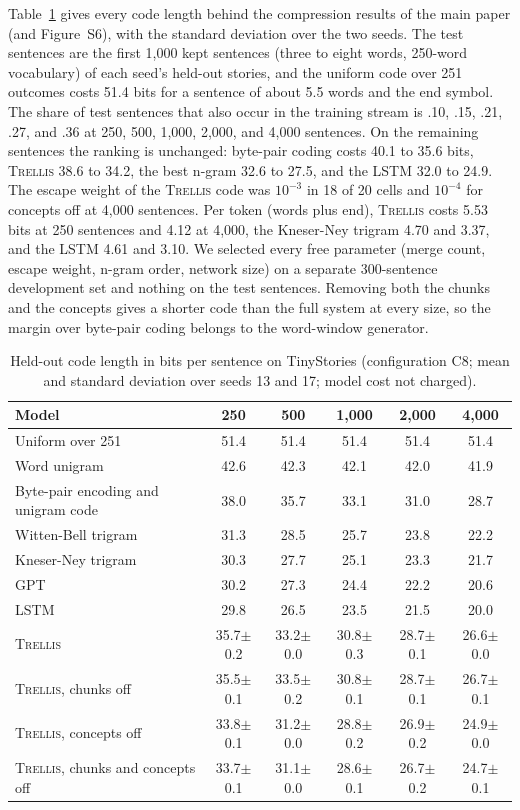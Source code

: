 \documentclass[11pt,letterpaper]{article}
\newcommand{\trellis}{\textsc{Trellis}}
\begin{document}
Table~\ref{tab:bits} gives every code length behind the compression results of the main paper (and Figure~S6), with the standard deviation over the two seeds.
The test sentences are the first 1,000 kept sentences (three to eight words, 250-word vocabulary) of each seed's held-out stories, and the uniform code over 251 outcomes costs 51.4 bits for a sentence of about 5.5 words and the end symbol.
The share of test sentences that also occur in the training stream is .10, .15, .21, .27, and .36 at 250, 500, 1,000, 2,000, and 4,000 sentences.
On the remaining sentences the ranking is unchanged: byte-pair coding costs 40.1 to 35.6 bits, \trellis{} 38.6 to 34.2, the best n-gram 32.6 to 27.5, and the LSTM 32.0 to 24.9.
The escape weight of the \trellis{} code was $10^{-3}$ in 18 of 20 cells and $10^{-4}$ for concepts off at 4,000 sentences.
Per token (words plus end), \trellis{} costs 5.53 bits at 250 sentences and 4.12 at 4,000, the Kneser-Ney trigram 4.70 and 3.37, and the LSTM 4.61 and 3.10.
We selected every free parameter (merge count, escape weight, n-gram order, network size) on a separate 300-sentence development set and nothing on the test sentences.
Removing both the chunks and the concepts gives a shorter code than the full system at every size, so the margin over byte-pair coding belongs to the word-window generator.

\begin{table}[h]
\caption{Held-out code length in bits per sentence on TinyStories (configuration C8; mean and standard deviation over seeds 13 and 17; model cost not charged).}
\label{tab:bits}
\begin{center}
\footnotesize
\begin{tabular}{lccccc}
\toprule
Model & 250 & 500 & 1,000 & 2,000 & 4,000 \\
\midrule
Uniform over 251 & 51.4 & 51.4 & 51.4 & 51.4 & 51.4 \\
Word unigram & 42.6 & 42.3 & 42.1 & 42.0 & 41.9 \\
Byte-pair encoding and unigram code & 38.0 & 35.7 & 33.1 & 31.0 & 28.7 \\
Witten-Bell trigram & 31.3 & 28.5 & 25.7 & 23.8 & 22.2 \\
Kneser-Ney trigram & 30.3 & 27.7 & 25.1 & 23.3 & 21.7 \\
GPT & 30.2 & 27.3 & 24.4 & 22.2 & 20.6 \\
LSTM & 29.8 & 26.5 & 23.5 & 21.5 & 20.0 \\
\trellis{} & 35.7$\pm$0.2 & 33.2$\pm$0.0 & 30.8$\pm$0.3 & 28.7$\pm$0.1 & 26.6$\pm$0.0 \\
\trellis{}, chunks off & 35.5$\pm$0.1 & 33.5$\pm$0.2 & 30.8$\pm$0.1 & 28.7$\pm$0.1 & 26.7$\pm$0.1 \\
\trellis{}, concepts off & 33.8$\pm$0.1 & 31.2$\pm$0.0 & 28.8$\pm$0.2 & 26.9$\pm$0.2 & 24.9$\pm$0.0 \\
\trellis{}, chunks and concepts off & 33.7$\pm$0.1 & 31.1$\pm$0.0 & 28.6$\pm$0.1 & 26.7$\pm$0.2 & 24.7$\pm$0.1 \\
\bottomrule
\end{tabular}
\end{center}
\end{table}
\end{document}
